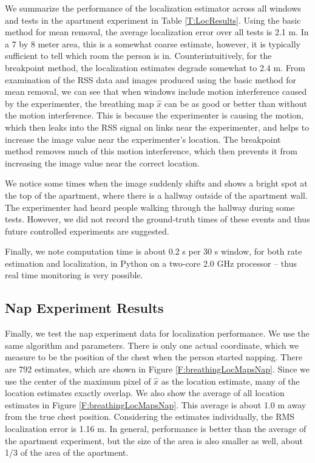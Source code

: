 \documentclass[10pt,journal,letterpaper]{IEEEtran}
\begin{document}
We summarize the performance of the localization estimator across all windows and tests in the apartment experiment in Table \ref{T:LocResults}.  Using the basic method for mean removal, the average localization error over all tests is 2.1 m.  In a 7 by 8 meter area, this is a somewhat coarse estimate, however, it is typically sufficient to tell which room the person is in. Counterintuitively, for the breakpoint method, the localization estimates degrade somewhat to 2.4 m.  From examination of the RSS data and images produced using the basic method for mean removal, we can see that when windows include motion interference caused by the experimenter, the breathing map $\hat{x}$ can be as good or better than without the motion interference.  This is because the experimenter is causing the motion, which then leaks into the RSS signal on links near the experimenter, and helps to increase the image value near the experimenter's location.  The breakpoint method removes much of this motion interference, which then 
prevents it from increasing the 
image value near the correct location.


We notice some times when the image suddenly shifts and shows a bright spot at the top of the apartment, where there is a hallway outside of the apartment wall.  The experimenter had heard people walking through the hallway during some tests.  However, we did not record the ground-truth times of these events and thus future controlled experiments are suggested.

Finally, we note computation time is about 0.2 s per 30 s window, for both rate estimation and localization, in Python on a two-core 2.0 GHz processor -- thus real time monitoring is very possible.

\subsection{Nap Experiment Results}

Finally, we test the nap experiment data for localization performance.  We use the same algorithm and parameters.  There is only one actual coordinate, which we measure to be the position of the chest when the person started napping.  There are 792 estimates, which are shown in Figure \ref{F:breathingLocMapsNap}.  Since we use the center of the maximum pixel of $\hat{x}$ as the location estimate, many of the location estimates exactly overlap.  We also show the average of all location estimates in Figure \ref{F:breathingLocMapsNap}.  This average is about 1.0 m away from the true chest position.  Considering the estimates individually, the RMS localization error is 1.16 m.   In general, performance is better than the average of the apartment experiment, but the size of the area is also smaller as well, about 1/3 of the area of the apartment.
\end{document}
